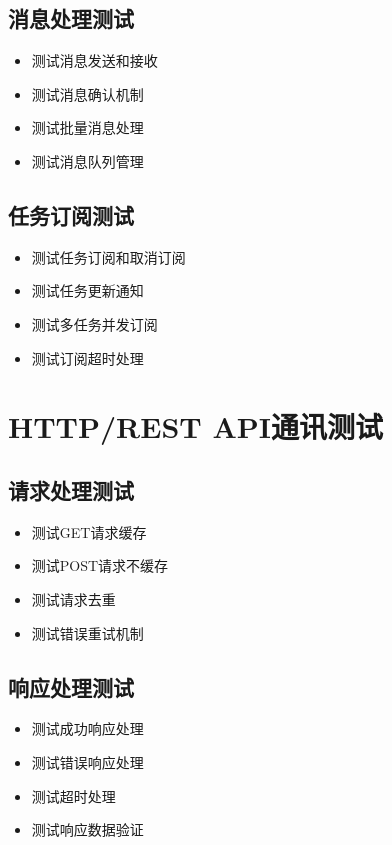 \documentclass[12pt,a4paper,openany]{report}
\begin{document}
\subsection{消息处理测试}

\begin{itemize}
    \item 测试消息发送和接收
    \item 测试消息确认机制
    \item 测试批量消息处理
    \item 测试消息队列管理
\end{itemize}

\subsection{任务订阅测试}

\begin{itemize}
    \item 测试任务订阅和取消订阅
    \item 测试任务更新通知
    \item 测试多任务并发订阅
    \item 测试订阅超时处理
\end{itemize}

\section{HTTP/REST API通讯测试}

\subsection{请求处理测试}

\begin{itemize}
    \item 测试GET请求缓存
    \item 测试POST请求不缓存
    \item 测试请求去重
    \item 测试错误重试机制
\end{itemize}

\subsection{响应处理测试}

\begin{itemize}
    \item 测试成功响应处理
    \item 测试错误响应处理
    \item 测试超时处理
    \item 测试响应数据验证
\end{itemize}
\end{document}
